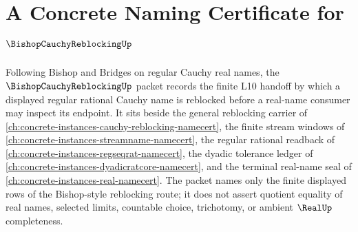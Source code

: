 \chapter{A Concrete Naming Certificate for $\BishopCauchyReblockingUp$}
\label{ch:concrete-instances-bishop-cauchy-reblocking-namecert}

Following Bishop and Bridges on regular Cauchy real names, the $\BishopCauchyReblockingUp$ packet records the finite L10 handoff by which a displayed regular rational Cauchy name is reblocked before a real-name consumer may inspect its endpoint. It sits beside the general reblocking carrier of \autoref{ch:concrete-instances-cauchy-reblocking-namecert}, the finite stream windows of \autoref{ch:concrete-instances-streamname-namecert}, the regular rational readback of \autoref{ch:concrete-instances-regseqrat-namecert}, the dyadic tolerance ledger of \autoref{ch:concrete-instances-dyadicratcore-namecert}, and the terminal real-name seal of \autoref{ch:concrete-instances-real-namecert}. The packet names only the finite displayed rows of the Bishop-style reblocking route; it does not assert quotient equality of real names, selected limits, countable choice, trichotomy, or ambient $\RealUp$ completeness.

